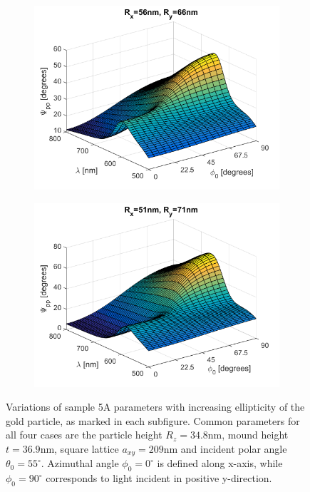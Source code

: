 \begin{figure}[h!]
    \begin{subfigure}{0.5\textwidth}
        \centering
        \includegraphics[width=\linewidth]{figures/ch4/S5A/comparisons/Psipp_vs_lambda_vs_phi_Rx56_Ry66_Rz348_t369_axy209_theta55.png}
    \end{subfigure}
    \begin{subfigure}{0.5\textwidth}
        \centering
        \includegraphics[width=\linewidth]{figures/ch4/S5A/comparisons/Psipp_vs_lambda_vs_phi_Rx51_Ry71_Rz348_t369_axy209_theta55.png}
    \end{subfigure}
    \caption{Variations of sample 5A parameters with increasing ellipticity of the gold particle, as marked in each subfigure. Common parameters for all four cases are the particle height $R_z=34.8$nm, mound height $t=36.9$nm, square lattice $a_{xy}=209$nm and incident polar angle $\theta_0=55^\circ$. Azimuthal angle $\phi_0=0^\circ$ is defined along x-axis, while $\phi_0=90^\circ$ corresponds to light incident in positive y-direction.}
    \label{fig:S5A_comparison_Psi_ellipticity}
\end{figure}

